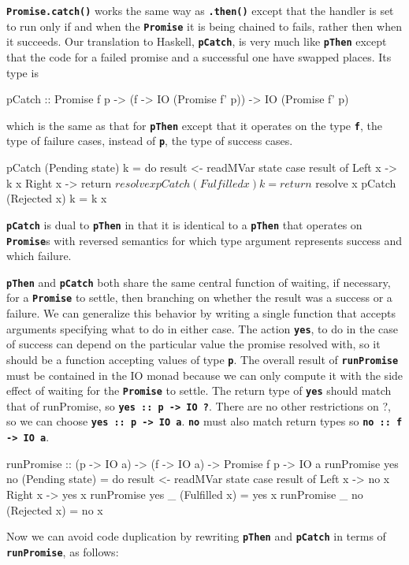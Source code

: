 \documentclass[12pt, english, letterpaper]{kuthesis}
\newcommand{\lit}[1]{\textbf{\texttt{#1}}}
\begin{document}
 \lit{Promise.catch()} works the same way as \lit{.then()} except that the handler is set to run only if and when the \lit{Promise} it is being chained to fails, rather then when it succeeds.  Our translation to Haskell, \lit{pCatch}, is very much like \lit{pThen} except that the code for a failed promise and a successful one have swapped places.  Its type is
 \begin{code}
pCatch :: Promise f p
        -> (f -> IO (Promise f' p))
        -> IO (Promise f' p)
\end{code}
which is the same as that for \lit{pThen} except that it operates on the type \lit f, the type of failure cases, instead of \lit p, the type of success cases.
\begin{code}
pCatch (Pending state) k = do
  result <- readMVar state
  case result of
    Left x -> k x
    Right x -> return $ resolve x
pCatch (Fulfilled x) k = return $ resolve x
pCatch (Rejected x) k = k x
\end{code}
\lit{pCatch} is dual to \lit{pThen} in that it is identical to a \lit{pThen} that operates on \lit{Promise}s with reversed semantics for which type argument represents success and which failure.

\lit{pThen} and \lit{pCatch} both share the same central function of waiting, if necessary, for a \lit{Promise} to settle, then branching on whether the result was a success or a failure.  We can generalize this behavior by writing a single function that accepts arguments specifying what to do in either case.  The action \lit{yes}, to do in the case of success can depend on the particular value the promise resolved with, so it should be a function accepting values of type \lit p.  The overall result of \lit{runPromise} must be contained in the IO monad because we can only compute it with the side effect of waiting for the \lit{Promise} to settle.  The return type of \lit{yes} should match that of runPromise, so \lit{yes ::\ p -> IO ?}.  There are no other restrictions on ?, so we can choose \lit{yes ::\ p -> IO a}. \lit{no} must also match return types so \lit{no ::\ f -> IO a}.

\begin{code}
runPromise :: (p -> IO a) -> (f -> IO a) -> Promise f p -> IO a
runPromise yes no (Pending state) = do
  result <- readMVar state
  case result of
    Left x -> no x
    Right x -> yes x
runPromise yes _ (Fulfilled x) = yes x
runPromise _ no (Rejected x) = no x
\end{code}
Now we can avoid code duplication by rewriting \lit{pThen} and \lit{pCatch} in terms of \lit{runPromise}, as follows:
\end{document}
